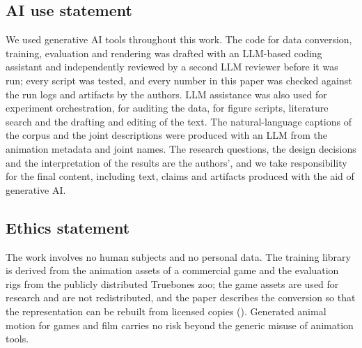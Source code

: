 \subsection*{AI use statement}
We used generative AI tools throughout this work. The code for data conversion, training, evaluation
and rendering was drafted with an LLM-based coding assistant and independently reviewed by a second
LLM reviewer before it was run; every script was tested, and every number in this paper was checked
against the run logs and artifacts by the authors. LLM assistance was also used for experiment
orchestration, for auditing the data, for figure scripts, literature search
and the drafting and editing of the text. The natural-language captions of the corpus and the joint
descriptions were produced with an LLM from the animation metadata and joint names. The research
questions, the design decisions and the interpretation of the results are the authors', and we take
responsibility for the final content, including text, claims and artifacts produced with the aid of
generative AI.

\subsection*{Ethics statement}
The work involves no human subjects and no personal data. The training library is derived from the
animation assets of a commercial game and the evaluation rigs from the publicly distributed
Truebones zoo; the game assets are used for research and are not redistributed, and the paper
describes the conversion so that the representation can be rebuilt from licensed copies
(). Generated animal motion for games and film
carries no risk beyond the generic misuse of animation tools.
